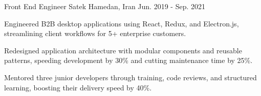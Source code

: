 \begin{cventries}
  \cventry
  {Front End Engineer} %
  {Satek} %
  {Hamedan, Iran} %
  {Jun. 2019 - Sep. 2021} %
  {
    \begin{cvitems} %
      \item {Engineered B2B desktop applications using React, Redux, and Electron.js, streamlining client workflows for 5+ enterprise customers.}
      \item {Redesigned application architecture with modular components and reusable patterns, speeding development by 30\% and cutting maintenance time by 25\%.}
      \item {Mentored three junior developers through training, code reviews, and structured learning, boosting their delivery speed by 40\%.}
    \end{cvitems}
  }
\end{cventries}
